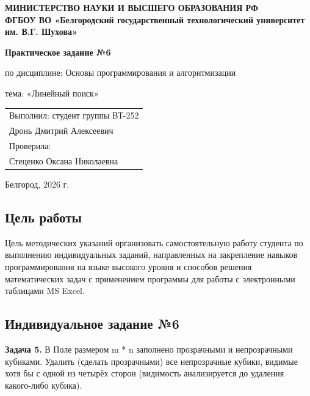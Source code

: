 \documentclass[a4paper,12pt]{article}
\begin{document}
\begin{titlepage}
    \centering
    {\bfseries МИНИСТЕРСТВО НАУКИ И ВЫСШЕГО ОБРАЗОВАНИЯ РФ \\
    ФГБОУ ВО «Белгородский государственный технологический университет им. В.Г. Шухова»\par}
    
    \vfill
    
    {\bfseries\Large Практическое задание №6\par}
    \vspace{0.5cm}
    {\large по дисциплине: Основы программирования и алгоритмизации \par}
    {\large тема: «Линейный поиск» \par}
    
    \vfill
    
    \begin{flushright}
    \begin{tabular}{l}
        \large Выполнил: студент группы ВТ-252 \\
        \large Дронь Дмитрий Алексеевич \\
        \large Проверила: \\
        \large Стеценко Оксана Николаевна
    \end{tabular}
    \end{flushright}
    
    \vfill
    
    {\large Белгород, 2026 г. \par}
\end{titlepage}

\newpage
\begin{center}
\section*{Цель работы}
\end{center}
Цель методических указаний организовать самостоятельную работу студента по выполнению индивидуальных заданий, направленных на закрепление навыков программирования на языке высокого уровня и способов решения математических задач с применением программы для работы с электронными таблицами MS Excel.
\newpage
\begin{center}
\section*{Индивидуальное задание №6}
\end{center}
\textbf{Задача 5.} В Поле размером m * n заполнено прозрачными и непрозрачными
кубиками. Удалить (сделать прозрачными) все непрозрачные кубики, видимые хотя бы с одной из четырёх сторон (видимость анализируется до удаления какого-либо кубика).
\newpage
\end{document}

